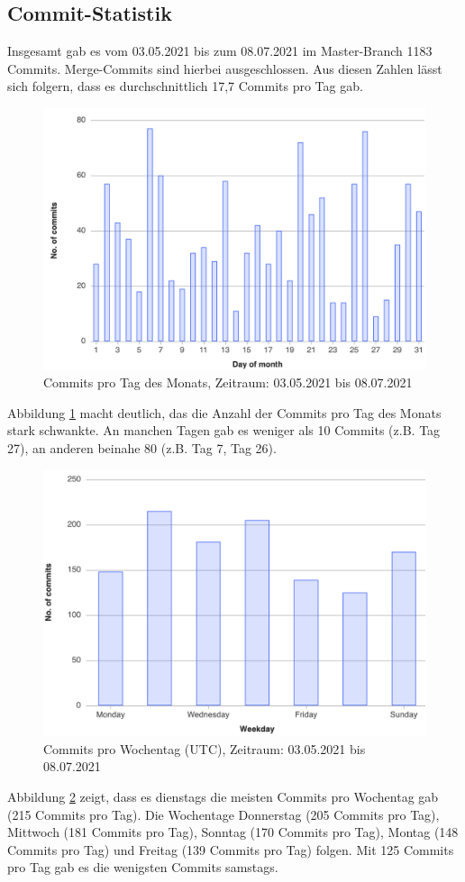 \documentclass[../review_3.tex]{subfiles}
\begin{document}
\subsection{Commit-Statistik}
Insgesamt gab es vom 03.05.2021 bis zum 08.07.2021 im Master-Branch 1183 Commits. Merge-Commits sind hierbei ausgeschlossen. Aus diesen Zahlen lässt sich folgern, dass es durchschnittlich 17,7 Commits pro Tag gab.
\begin{figure} [H]
    \centering
    \includegraphics[width =0.6\linewidth]{img/gitlab2.png}
    \caption{Commits pro Tag des Monats, Zeitraum: 03.05.2021 bis 08.07.2021}
    \label{gitlab2}
\end{figure}
Abbildung \ref{gitlab2} macht deutlich, das die Anzahl der Commits pro Tag des Monats stark schwankte. An manchen Tagen gab es weniger als 10 Commits (z.B. Tag 27), an anderen beinahe 80 (z.B. Tag 7, Tag 26).
\begin{figure} [H]
    \centering
    \includegraphics[width =0.55\linewidth]{img/gitlab3.png}
    \caption{Commits pro Wochentag (UTC), Zeitraum: 03.05.2021 bis 08.07.2021}
    \label{gitlab3}
\end{figure}
Abbildung \ref{gitlab3} zeigt, dass es dienstags die meisten Commits pro Wochentag gab (215 Commits pro Tag). Die Wochentage Donnerstag (205 Commits pro Tag), Mittwoch (181 Commits pro Tag), Sonntag (170 Commits pro Tag), Montag (148 Commits pro Tag) und Freitag (139 Commits pro Tag) folgen. Mit 125 Commits pro Tag gab es die wenigsten Commits samstags.
\end{document}
